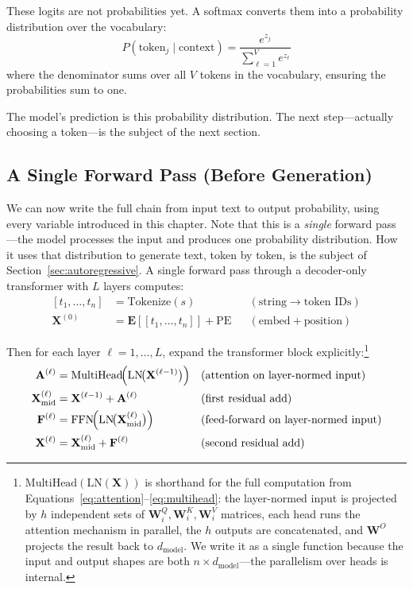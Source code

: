 These logits are not probabilities yet. A softmax converts them into a probability distribution over the vocabulary:
\begin{equation}
\label{eq:softmax-output}
P(\text{token}_j \mid \text{context}) = \frac{e^{z_j}}{\sum_{\ell=1}^{V} e^{z_\ell}}
\end{equation}
where the denominator sums over all $V$ tokens in the vocabulary, ensuring the probabilities sum to one.

The model's prediction is this probability distribution. The next step---actually choosing a token---is the subject of the next section.

\subsection{A Single Forward Pass (Before Generation)}
\label{sec:forward-pass}

We can now write the full chain from input text to output probability, using every variable introduced in this chapter. Note that this is a \emph{single} forward pass---the model processes the input and produces one probability distribution. How it uses that distribution to generate text, token by token, is the subject of Section~\ref{sec:autoregressive}. A single forward pass through a decoder-only transformer with $L$ layers computes:
\begin{equation}
\label{eq:full-forward}
\begin{aligned}
[t_1, \ldots, t_n] &= \text{Tokenize}(s) & &(\text{string} \to \text{token IDs}) \\
\mathbf{X}^{(0)} &= \mathbf{E}[[t_1, \ldots, t_n]] + \text{PE} & &(\text{embed} + \text{position})
\end{aligned}
\end{equation}

Then for each layer $\ell = 1, \ldots, L$, expand the transformer block explicitly:\footnote{$\text{MultiHead}(\text{LN}(\mathbf{X}))$ is shorthand for the full computation from Equations~\ref{eq:attention}--\ref{eq:multihead}: the layer-normed input is projected by $h$ independent sets of $\mathbf{W}_i^Q, \mathbf{W}_i^K, \mathbf{W}_i^V$ matrices, each head runs the attention mechanism in parallel, the $h$ outputs are concatenated, and $\mathbf{W}^O$ projects the result back to $d_{\text{model}}$. We write it as a single function because the input and output shapes are both $n \times d_{\text{model}}$---the parallelism over heads is internal.}
\begin{align}
\mathbf{A}^{(\ell)} &= \text{MultiHead}\!\Big(\text{LN}\!\big(\mathbf{X}^{(\ell-1)}\big)\Big) & &(\text{attention on layer-normed input}) \notag \\
\mathbf{X}_{\text{mid}}^{(\ell)} &= \mathbf{X}^{(\ell-1)} + \mathbf{A}^{(\ell)} & &(\text{first residual add}) \notag \\
\mathbf{F}^{(\ell)} &= \text{FFN}\!\Big(\text{LN}\!\big(\mathbf{X}_{\text{mid}}^{(\ell)}\big)\Big) & &(\text{feed-forward on layer-normed input}) \notag \\
\mathbf{X}^{(\ell)} &= \mathbf{X}_{\text{mid}}^{(\ell)} + \mathbf{F}^{(\ell)} & &(\text{second residual add})
\end{align}

